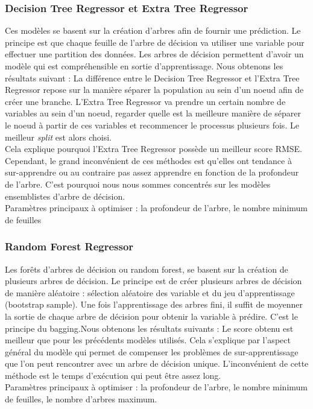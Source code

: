 \documentclass{article} %
\begin{document}
\subsubsection{Decision Tree Regressor et Extra Tree Regressor}
Ces modèles se basent sur la création d'arbres afin de fournir une prédiction. Le principe est que chaque feuille de l'arbre de décision va utiliser une variable pour effectuer une partition des données. Les arbres de décision permettent d'avoir un modèle qui est compréhensible en sortie d'apprentissage. Nous obtenons les résultats suivant :
La différence entre le Decision Tree Regressor et l'Extra Tree Regressor repose sur la manière séparer la population au sein d'un noeud afin de créer une branche. L'Extra Tree Regressor va prendre un certain nombre de variables au sein d'un noeud, regarder quelle est la meilleure manière de séparer le noeud à partir de ces variables et recommencer le processus plusieurs fois. Le meilleur \textit{split} est alors choisi.\\
Cela explique pourquoi l'Extra Tree Regressor possède un meilleur score RMSE. Cependant, le grand inconvénient de ces méthodes est qu'elles ont tendance à sur-apprendre ou au contraire pas assez apprendre en fonction de la profondeur de l'arbre. C'est pourquoi nous nous sommes concentrés sur les modèles ensemblistes d'arbre de décision.\\
Paramètres principaux à optimiser : la profondeur de l'arbre, le nombre minimum de feuilles

\subsubsection{Random Forest Regressor}
Les forêts d'arbres de décision ou random forest, se basent sur la création de plusieurs arbres de décision. Le principe est de créer plusieurs arbres de décision de manière aléatoire : sélection aléatoire des variable et du jeu d'apprentissage (bootstrap sample). Une fois l'apprentissage des arbres fini, il suffit de moyenner la sortie de chaque arbre de décision pour obtenir la variable à prédire. C'est le principe du bagging.Nous obtenons les résultats suivants :
Le score obtenu est meilleur que pour les précédents modèles utilisés. Cela s'explique par l'aspect général du modèle qui permet de compenser les problèmes de sur-apprentissage que l'on peut rencontrer avec un arbre de décision unique. L'inconvénient de cette méthode est le temps d'exécution qui peut être assez long.\\
Paramètres principaux à optimiser : la profondeur de l'arbre, le nombre minimum de feuilles, le nombre d'arbres maximum.
\end{document}
